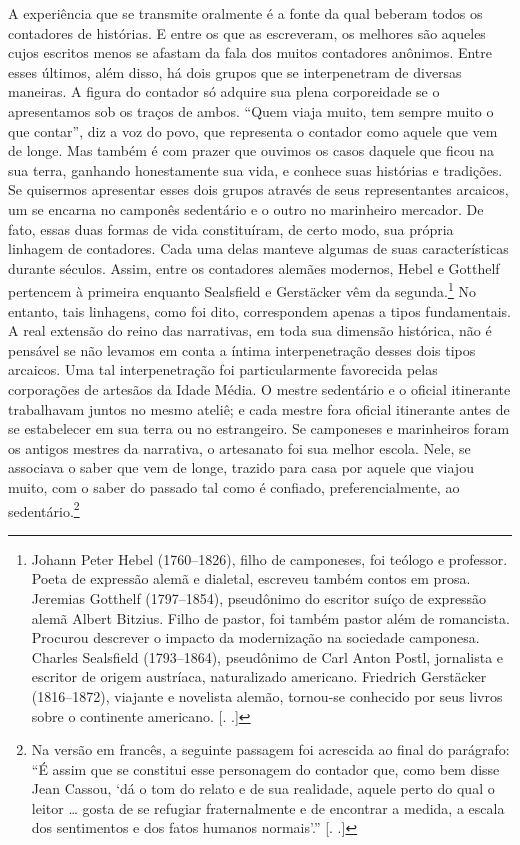 A experiência que se transmite oralmente é a fonte da qual beberam todos
os contadores de histórias. E entre os que as escreveram, os melhores
são aqueles cujos escritos menos se afastam da fala dos muitos
contadores anônimos. Entre esses últimos, além disso, há dois grupos que
se interpenetram de diversas maneiras. A figura do contador só adquire
sua plena corporeidade se o apresentamos sob os traços de ambos. ``Quem
viaja muito, tem sempre muito o que contar'', diz a voz do povo, que
representa o contador como aquele que vem de longe. Mas também é com
prazer que ouvimos os casos daquele que ficou na sua terra, ganhando
honestamente sua vida, e conhece suas histórias e tradições. Se
quisermos apresentar esses dois grupos através de seus representantes
arcaicos, um se encarna no camponês sedentário e o outro no marinheiro
mercador. De fato, essas duas formas de vida constituíram, de certo
modo, sua própria linhagem de contadores. Cada uma delas manteve algumas
de suas características durante séculos. Assim, entre os contadores
alemães modernos, Hebel e Gotthelf pertencem à primeira enquanto
Sealsfield e Gerstäcker vêm da segunda.\footnote{Johann Peter Hebel
  (1760--1826), filho de camponeses, foi teólogo e professor. Poeta de
  expressão alemã e dialetal, escreveu também contos em prosa. Jeremias
  Gotthelf (1797--1854), pseudônimo do escritor suíço de expressão alemã
  Albert Bitzius. Filho de pastor, foi também pastor além de romancista.
  Procurou descrever o impacto da modernização na sociedade camponesa.
  Charles Sealsfield (1793--1864), pseudônimo de Carl Anton Postl,
  jornalista e escritor de origem austríaca, naturalizado americano.
  Friedrich Gerstäcker (1816--1872), viajante e novelista alemão,
  tornou-se conhecido por seus livros sobre o continente americano.
  [. .]} No entanto, tais linhagens, como foi dito,
correspondem apenas a tipos fundamentais. A real extensão do reino das
narrativas, em toda sua dimensão histórica, não é pensável se não
levamos em conta a íntima interpenetração desses dois tipos arcaicos.
Uma tal interpenetração foi particularmente favorecida pelas corporações
de artesãos da Idade Média. O mestre sedentário e o oficial itinerante trabalhavam juntos no mesmo ateliê; e cada mestre fora oficial itinerante
antes de se estabelecer em sua terra ou no estrangeiro. Se camponeses e
marinheiros foram os antigos mestres da narrativa, o artesanato foi sua
melhor escola. Nele, se associava o saber que vem de longe, trazido para
casa por aquele que viajou muito, com o saber do passado tal como 
é confiado, preferencialmente, ao sedentário.\footnote{Na versão em
  francês, a seguinte passagem foi acrescida ao final do parágrafo: ``É
  assim que se constitui esse personagem do contador que, como bem disse
  Jean Cassou, `dá o tom do relato e de sua realidade, aquele perto do
  qual o leitor \ldots{} gosta de se refugiar fraternalmente e de
  encontrar a medida, a escala dos sentimentos e dos fatos humanos
  normais'.'' [. .]}

